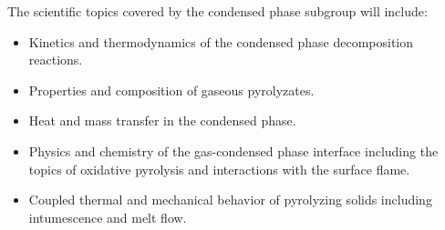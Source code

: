 The scientific topics covered by the condensed phase subgroup will include:

\begin{itemize}
\item Kinetics and thermodynamics of the condensed phase decomposition reactions.
\item Properties and composition of gaseous pyrolyzates.
\item Heat and mass transfer in the condensed phase.
\item Physics and chemistry of the gas-condensed phase interface including the topics of oxidative pyrolysis and interactions with the surface flame.
\item Coupled thermal and mechanical behavior of pyrolyzing solids including intumescence and melt flow.
\end{itemize}

